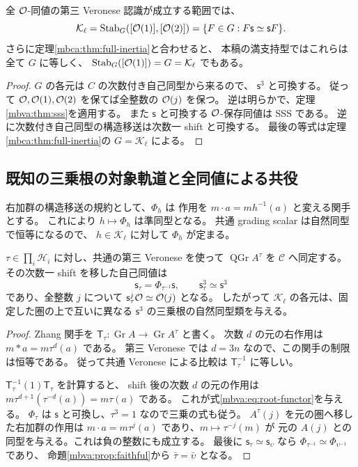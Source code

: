\begin{corollary}[二つの対象と次数一自己同値の安定化群]
\label{mbva:cor:pair-stabilizer}
全 $\mathcal O$-同値の第三 Veronese 認識が成立する範囲では、
\[
 \mathcal K_\ell
  =\operatorname{Stab}_{G}([\mathcal O(1)],[\mathcal O(2)])
  =\{F\in G:F\mathsf s\simeq\mathsf s F\}.
\]
さらに定理\ref{mbca:thm:full-inertia}と合わせると、
本稿の満支持型ではこれらは全て $G$ に等しく、
$\operatorname{Stab}_G([\mathcal O(1)])=G=\mathcal K_\ell$ でもある。
\end{corollary}
\begin{proof}
$G$ の各元は $C$ の次数付き自己同型から来るので、
$\mathsf s^3$ と可換する。
従って $\mathcal O,\mathcal O(1),\mathcal O(2)$ を保てば全整数の $\mathcal O(j)$ を保つ。
逆は明らかで、定理\ref{mbva:thm:sss}を適用する。
また $\mathsf s$ と可換する $\mathcal O$-保存同値は SSS である。
逆に次数付き自己同型の構造移送は次数一 shift と可換する。
最後の等式は定理\ref{mbca:thm:full-inertia}の $G=\mathcal K_\ell$ による。
\end{proof}

\subsection{既知の三乗根の対象軌道と全同値による共役}

右加群の構造移送の規約として、$\Phi_h$ は
作用を $m\cdot a=m h^{-1}(a)$ と変える関手とする。
これにより $h\mapsto\Phi_h$ は準同型となる。
共通 grading scalar は自然同型で恒等になるので、
$h\in\mathcal K_\ell$ に対して $\Phi_h$ が定まる。

\begin{proposition}
\label{mbva:prop:root-functors}
$\tau\in\prod_i\mathcal H_i$ に対し、共通の第三 Veronese を使って
$\operatorname{QGr}A^\tau$ を $\mathscr C$ へ同定する。
その次数一 shift を移した自己同値は
\begin{equation}\label{mbva:eq:root-functor}
 \mathsf s_\tau=\Phi_{\tau^{-1}}\mathsf s,\qquad
 \mathsf s_\tau^3\simeq\mathsf s^3
\end{equation}
であり、全整数 $j$ について
$\mathsf s_\tau^j\mathcal O\simeq\mathcal O(j)$ となる。
したがって $\mathcal K_\ell$ の各元は、固定した圏の上で互いに異なる
$\mathsf s^3$ の三乗根の自然同型類を与える。
\end{proposition}
\begin{proof}
Zhang 関手を $\mathsf T_\tau:\operatorname{Gr}A\to\operatorname{Gr}A^\tau$ と書く。
次数 $d$ の元の右作用は $m*a=m\tau^d(a)$ である。
第三 Veronese では $d=3n$ なので、この関手の制限は恒等である。
従って共通 Veronese による比較は $\mathsf T_\tau^{-1}$ に等しい。

$\mathsf T_\tau^{-1}(1)\mathsf T_\tau$ を計算すると、
shift 後の次数 $d$ の元の作用は
$m\tau^{d+1}(\tau^{-d}(a))=m\tau(a)$ である。
これが式\eqref{mbva:eq:root-functor}を与える。
$\Phi_\tau$ は $\mathsf s$ と可換し、$\tau^3=1$ なので三乗の式も従う。
$A^\tau(j)$ を元の圏へ移した右加群の作用は
$m\cdot a=m\tau^j(a)$ であり、$m\mapsto\tau^{-j}(m)$ が
元の $A(j)$ との同型を与える。これは負の整数にも成立する。
最後に $\mathsf s_\tau\simeq\mathsf s_\upsilon$ なら
$\Phi_{\tau^{-1}}\simeq\Phi_{\upsilon^{-1}}$ であり、
命題\ref{mbva:prop:faithful}から $\bar\tau=\bar\upsilon$ となる。
\end{proof}

